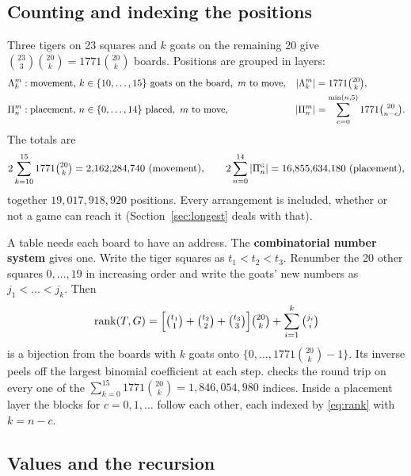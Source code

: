 \subsection{Counting and indexing the positions}\label{sec:indexing}

Three tigers on 23 squares and $k$ goats on the remaining 20 give $\binom{23}{3}\binom{20}{k} = 1771 \binom{20}{k}$
boards. Positions are grouped in layers:
\begin{align*}
\Lambda^m_k &: \text{movement, } k \in \{10, \dots, 15\} \text{ goats on the board},\ m \text{ to move}, & |\Lambda^m_k| &= 1771 \tbinom{20}{k}, \\
\Pi^m_n &: \text{placement, } n \in \{0, \dots, 14\} \text{ placed},\ m \text{ to move}, & |\Pi^m_n| &= \sum_{c=0}^{\min(n, 5)} 1771 \tbinom{20}{n - c}.
\end{align*}
The totals are
\[
2 \sum_{k=10}^{15} 1771 \tbinom{20}{k} = 2{,}162{,}284{,}740 \ \text{(movement)}, \qquad
2 \sum_{n=0}^{14} |\Pi^{\gt}_n| = 16{,}855{,}634{,}180 \ \text{(placement)},
\]
together $19{,}017{,}918{,}920$ positions. Every arrangement is included, whether or not a game can reach it
(Section~\ref{sec:longest} deals with that).

A table needs each board to have an address. The \textbf{combinatorial number system} gives one. Write the
tiger squares as $t_1 < t_2 < t_3$. Renumber the 20 other squares $0, \dots, 19$ in increasing order and write the
goats' new numbers as $j_1 < \dots < j_k$. Then
\begin{equation}\label{eq:rank}
\operatorname{rank}(T, G) = \Big[\tbinom{t_1}{1} + \tbinom{t_2}{2} + \tbinom{t_3}{3}\Big] \tbinom{20}{k} + \sum_{i=1}^{k} \tbinom{j_i}{i}
\end{equation}
is a bijection from the boards with $k$ goats onto $\{0, \dots, 1771\binom{20}{k} - 1\}$. Its inverse peels off the
largest binomial coefficient at each step.  checks the round trip on every one of the
$\sum_{k=0}^{15} 1771 \binom{20}{k} = 1{,}846{,}054{,}980$ indices. Inside a placement layer the blocks for
$c = 0, 1, \dots$ follow each other, each indexed by \eqref{eq:rank} with $k = n - c$.

\subsection{Values and the recursion}\label{sec:dp-values}


